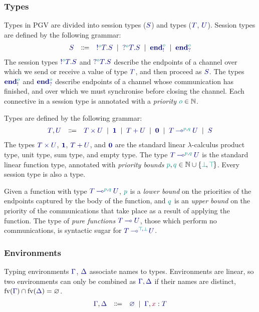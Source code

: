 \documentclass[main.tex]{subfiles}
\begin{document}
\subsubsection*{Types}
Types in PGV are divided into session types ($\ty{S}$) and types ($\ty{T}$, $\ty{U}$).
%
Session types are defined by the following grammar:
\[
\begin{array}{lcl}
  \ty{S}
  & \Coloneqq & \ty{\tysend[\cs{o}]{T}{S}}
    \sep        \ty{\tyrecv[\cs{o}]{T}{S}}
    \sep        \ty{\tyends[\cs{o}]}
    \sep        \ty{\tyendr[\cs{o}]}
\end{array}
\]
The session types $\ty{\tysend[\cs{o}]{T}{S}}$ and $\ty{\tyrecv[\cs{o}]{T}{S}}$ describe the endpoints of a channel over which we send or receive a value of type $\ty{T}$, and then proceed as $\ty{S}$. The types $\ty{\tyends[\cs{o}]}$ and $\ty{\tyendr[\cs{o}]}$ describe endpoints of a channel whose communication has finished, and over which we must synchronise before closing the channel. Each connective in a session type is annotated with a \emph{priority} $\cs{o}\in\mathbb{N}$.

Types are defined by the following grammar:
\[
\begin{array}{lcl}
  \ty{T}, \ty{U}
  & \Coloneqq & \ty{\typrod{T}{U}}
    \sep        \ty{\tyunit}
    \sep        \ty{\tysum{T}{U}}
    \sep        \ty{\tyvoid}
    \sep        \ty{\tylolli[\cs{p},\cs{q}]{T}{U}}
    \sep        \ty{S}
\end{array}
\]
The types $\ty{\typrod{T}{U}}$, $\ty{\tyunit}$, $\ty{\tysum{T}{U}}$, and $\ty{\tyvoid}$ are the standard linear $\lambda$-calculus product type, unit type, sum type, and empty type.
The type $\ty{\tylolli[\cs{p},\cs{q}]{T}{U}}$ is the standard linear function type, annotated with \emph{priority bounds} $\cs{p},\cs{q}\in\mathbb{N}\cup\{\cs{\pbot},\cs{\ptop}\}$.
Every session type is also a type.

Given a function with type $\ty{\tylolli[\cs{p},\cs{q}]{T}{U}}$, $\cs{p}$ is a \emph{lower bound} on the priorities of the endpoints captured by the body of the function, and $\cs{q}$ is an \emph{upper bound} on the priority of the communications that take place as a result of applying the function. The type of \emph{pure functions} $\ty{\tylolli{T}{U}}$, \ie those which perform no communications, is syntactic sugar for $\ty{\tylolli[\cs{\ptop},\cs{\pbot}]{T}{U}}$.

\subsubsection*{Environments}
Typing environments $\ty{\Gamma}$, $\ty{\Delta}$ associate names to types. Environments are linear, so two environments can only be combined as $\ty{\Gamma}, \ty{\Delta}$ if their names are distinct, \ie $\fv(\ty{\Gamma})\cap\fv(\ty{\Delta})=\varnothing$.
\[
\begin{array}{lcl}
  \ty{\Gamma}, \ty{\Delta}
  & \Coloneqq & \ty{\emptyenv}
    \sep        \ty{\Gamma}, \tmty{x}{T}
\end{array}
\]
\end{document}

